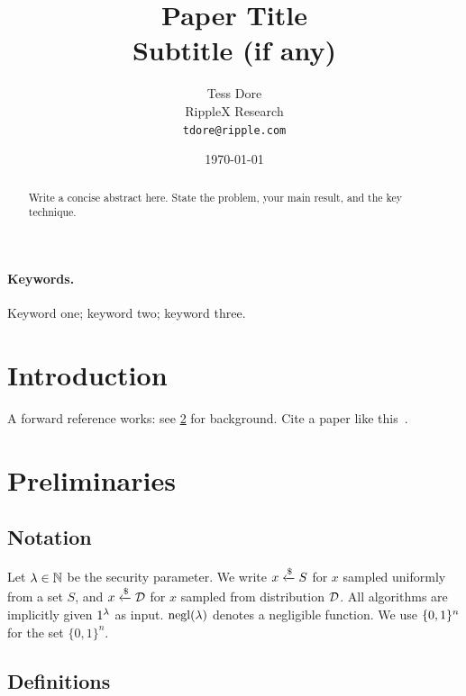 \documentclass[11pt, a4paper]{article}
\title{%
  \textbf{Paper Title}\\[0.5ex]
  \large Subtitle (if any)
}
\author{%
  Tess Dore\\
  \small RippleX Research\\
  \small \texttt{tdore@ripple.com}
}
\date{\today}   %
\begin{document}
\maketitle
\thispagestyle{plain}   %

\begin{abstract}
  Write a concise abstract here.
  State the problem, your main result, and the key technique.
\end{abstract}

\paragraph{Keywords.} Keyword one; keyword two; keyword three.

\tableofcontents
\newpage

\section{Introduction}
\label{sec:intro}

A forward reference works: see \cref{sec:prelim} for background.
Cite a paper like this~\cite{example2024}.

\section{Preliminaries}
\label{sec:prelim}

\subsection{Notation}

Let $\lambda \in \mathbb{N}$ be the security parameter.
We write $x \xleftarrow{\$} S$ for $x$ sampled uniformly from a set $S$,
and $x \xleftarrow{\$} \mathcal{D}$ for $x$ sampled from distribution $\mathcal{D}$.
All algorithms are implicitly given $1^{\lambda}$ as input.
$\mathrm{negl}(\lambda)$ denotes a negligible function.
We use $\{0,1\}^n$ for the set $\{0,1\}^n$.

\subsection{Definitions}
\end{document}
